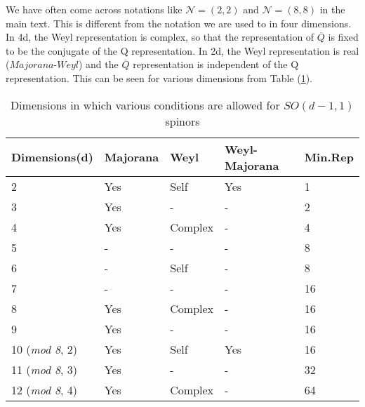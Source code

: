 We have often come across notations like $\mathcal{N} = (2,2)$ and $\mathcal{N} = (8,8)$ in the main text. This is different from the notation we are used to in four dimensions. In 4d, the Weyl representation is complex, so that the representation of $\overline{Q}$ is fixed to be the conjugate of the Q representation. In 2d, the Weyl representation is real ($\textit{Majorana-Weyl}$) and the $\overline{Q}$ representation is independent of the Q representation. This can be seen for various dimensions from Table (\ref{tab:spinor}). 

\begin {table}[htbp] 
\begin{center}
\begin{tabular}{ |  p{3cm} | l | l |  l | p{3cm} |}
    \hline
    \textbf{Dimensions(d)} & \textbf{Majorana} & \textbf{Weyl} & \textbf{Weyl-Majorana}  & \textbf{Min.Rep} \\ \hline \hline 
     2 & Yes & Self & Yes & 1 \\ \hline 
     3 & Yes & - & - & 2 \\ \hline
     4 & Yes & Complex & - & 4 \\ \hline
     5 & - & - & - & 8 \\ \hline
      6 & - & Self & - & 8 \\ \hline
     7 & - & - & - & 16 \\ \hline
     8 & Yes & Complex & - & 16 \\ \hline
     9 & Yes & - & - & 16 \\ \hline
     10 (\textit{mod 8}, 2) & Yes & Self & Yes & 16 \\ \hline
     11 (\textit{mod 8}, 3) & Yes & - & - & 32 \\ \hline
     12 (\textit{mod 8}, 4) & Yes & Complex & - & 64 \\ \hline
\end{tabular}
\vspace{3mm}
\caption {\label{tab:spinor} Dimensions in which various conditions are allowed for $SO(d-1,1)$ spinors} 
\end{center}
\end {table}


